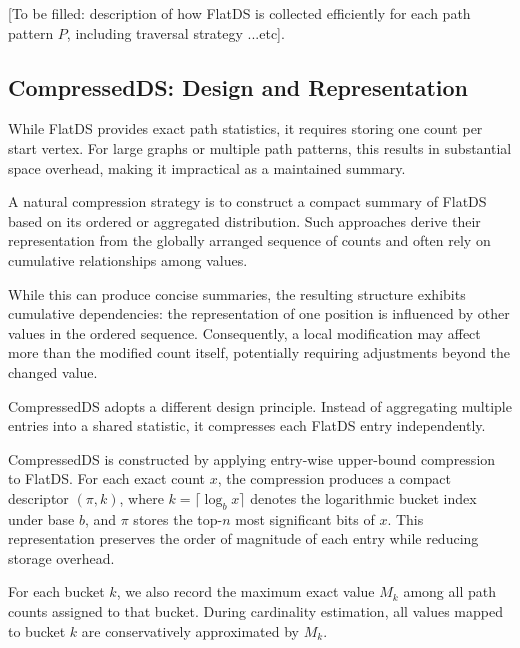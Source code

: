  [To be filled: description of how FlatDS is collected efficiently for each path pattern $P$, including traversal strategy ...etc].


\subsection{CompressedDS: Design and Representation}
\label{subsec:compress}

While FlatDS provides exact path statistics, it requires storing one
count per start vertex.
For large graphs or multiple path patterns, this results in substantial
space overhead, making it impractical as a maintained summary.

A natural compression strategy is to construct a compact summary
of FlatDS based on its ordered or aggregated distribution.
Such approaches derive their representation from the globally
arranged sequence of counts and often rely on cumulative
relationships among values.

While this can produce concise summaries, the resulting structure
exhibits cumulative dependencies: the representation of one position
is influenced by other values in the ordered sequence.
Consequently, a local modification may affect more than the modified
count itself, potentially requiring adjustments beyond the changed
value.

CompressedDS adopts a different design principle.
Instead of aggregating multiple entries into a shared statistic,
it compresses each FlatDS entry independently.


 CompressedDS is constructed by applying entry-wise upper-bound compression to FlatDS.
For each exact count $x$, the compression produces a compact descriptor
$(\pi, k)$, where $k = \lceil \log_b x \rceil$ denotes the logarithmic
bucket index under base $b$, and $\pi$ stores the top-$n$ most
significant bits of $x$.
This representation preserves the order of magnitude of each entry
while reducing storage overhead.

For each bucket $k$, we also record the maximum exact value
$M_k$ among all path counts assigned to that bucket.
During cardinality estimation, all values mapped to bucket $k$
are conservatively approximated by $M_k$.

\begin{algorithm}[t]
\caption{FastCompress: Constructing CompressedDS}
\label{alg:fastcompress}

\end{algorithm}

